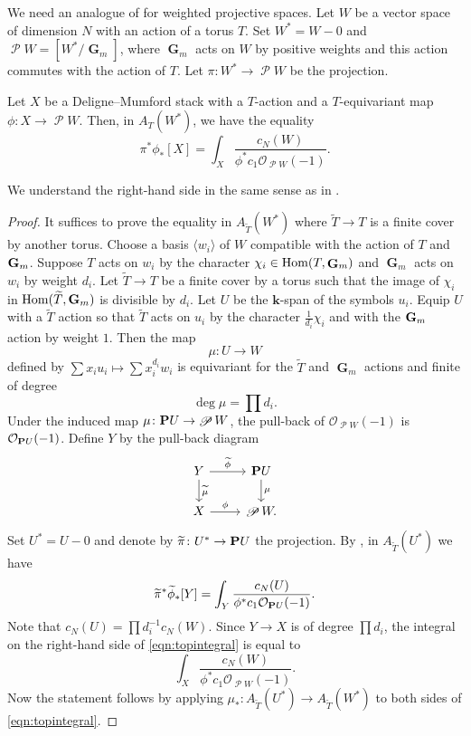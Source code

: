 \documentclass{amsart}
\renewcommand{\k}{\mathbf k}
\DeclareMathOperator{\G}{\mathbf G}
\DeclareMathOperator{\sP}{\mathscr P}
\renewcommand{\O}{\mathcal O}
\begin{document}
We need an analogue of  for weighted projective spaces.
Let \(W\) be a vector space of dimension \(N\) with an action of a torus \(T\).
Set \(W^{*} = W - 0\) and \(\sP W = [W^{*} \big / \G_m]\), where \(\G_m\) acts on \(W\) by positive weights and this action commutes with the action of \(T\).
Let \(\pi \colon W^{*} \to \sP W\) be the projection.
\begin{lemma}\label{prop:weightedpushforward}
  Let \(X\) be a Deligne--Mumford stack with a \(T\)-action and a \(T\)-equivariant map \(\phi \colon X \to \sP W\).
  Then, in \(A_T(W^{*})\), we have the equality
  \[ \pi^{*} \phi_{*}[X] = \int_X \frac{c_N(W)}{\phi^* c_1 \O_{\sP W}(-1)}.\]
\end{lemma}
We understand the right-hand side in the same sense as in .
\begin{proof}
  It suffices to prove the equality in \(A_{\widetilde T}(W^{*})\) where \(\widetilde T \to T\) is a finite cover by another torus.
  Choose a basis \(\langle  w_i \rangle\) of \(W\) compatible with the action of \(T\) and \(\Gm\).
  Suppose \(T\) acts on \(w_i\) by the character \(\chi_i \in \Hom(T, \G_m)\) and \(\G_m\) acts on \(w_i\) by weight \(d_i\).
  Let \(\widetilde T \to T\) be a finite cover by a torus such that the image of \(\chi_{i}\) in \(\Hom(\widetilde T, \Gm)\) is divisible by \(d_i\).
  Let \(U\) be the \(\k\)-span of the symbols \(u_{i}\).
  Equip \(U\) with a \(\widetilde T\) action so that \(\widetilde T\) acts on \(u_{i}\) by the character \(\frac{1}{d_i} \chi_{i}\) and with the \(\Gm\) action by weight \(1\).
  Then the map
  \[ \mu \colon U \to W\]
  defined by \(\sum x_iu_i \mapsto \sum x_i^{d_i} w_i\) is equivariant for the \(\widetilde T\) and \(\G_{m}\) actions and finite of degree
  \[ \deg \mu = \prod d_i.\]
  Under the induced map \(\mu \colon \P U \to \sP W\), the pull-back of \(\O_{\sP W}(-1)\) is \(\O_{\P U}(-1)\).
  Define \(Y\) by the pull-back diagram
  \[
  \begin{tikzcd}
    Y \ar{r}{\widetilde\phi}\ar{d}{\widetilde\mu} & \P U \ar{d}{\mu} \\
    X \ar{r}{\phi} &\sP W.
  \end{tikzcd}
\]
Set \(U^{*} = U-0\) and denote by \(\widetilde\pi \colon U^{*} \to \P U\) the projection.
By , in \(A_{\widetilde T}(U^{*})\) we have
\begin{equation}\label{eqn:topintegral}
  \widetilde\pi^{*} \widetilde\phi_{*}[Y] = \int_Y \frac{c_N(U)}{\phi^* c_1 \O_{\P U}(-1)}.
\end{equation}
Note that \(c_{N}(U) = \prod d_i^{-1} c_N(W)\).
Since \(Y \to X\) is of degree \(\prod d_i\), the integral on the right-hand side of \eqref{eqn:topintegral} is equal to
\[\int_X \frac{c_N(W)}{\phi^{*}c_1 \O_{\sP W}(-1)}.\]
Now the statement follows by applying \(\mu_{*} \colon A_{\widetilde T}(U^{*}) \to A_{\widetilde T}(W^{*})\) to both sides of \eqref{eqn:topintegral}.
\end{proof}
\end{document}
